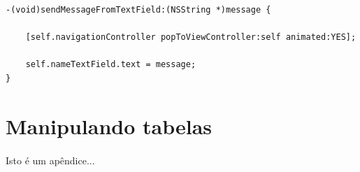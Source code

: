 \documentclass[a4paper,12pt,brazil,doubleside]{book}
\begin{document}
\begin{listing}
\begin{verbatim}
-(void)sendMessageFromTextField:(NSString *)message {
    
    [self.navigationController popToViewController:self animated:YES];
    
    self.nameTextField.text = message;
}
\end{verbatim}
\end{listing}

\bigskip
\bigskip


\section{Manipulando tabelas}

\paragraph{}


\singlespace
{}
\cleardoublepage
\thispagestyle{empty}
{}


\doublespace


\appendix
{} %

Isto é um apêndice...

\end{document}

